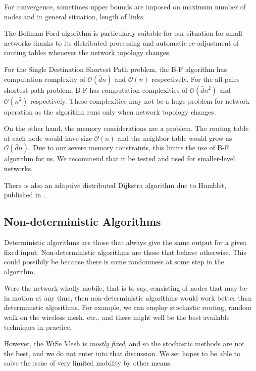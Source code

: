 \documentclass[fleqn,a4paper]{SelfArx}
\begin{document}
For convergence, sometimes upper bounds are imposed on maximum number of nodes and in general situation, length of links.

\par The Bellman-Ford algorithm is particularly suitable for our situation for small networks thanks to its distributed processing and automatic
re-adjustment of routing tables whenever the network topology changes. 

\par For the Single Destination Shortest Path problem, the B-F algorithm has computation complexity of $\mathcal{O}(\bar{d}n)$ and
$\mathcal{O}(n)$ respectively. For the all-pairs shortest path problem, B-F has computation complexities of $\mathcal{O}(\bar{d}n^2)$ 
and $\mathcal{O}(n^2)$ respectively. These complexities may not be a huge problem for network operation as the algorithm runs
only when network topology changes.

\par On the other hand, the memory considerations are a problem. The routing table at each node would have size $\mathcal{O}(n)$ and the 
neighbor table would grow as $\mathcal{O}(\bar{d}n)$. Due to our severe memory constraints, this limits the use of B-F algorithm for us.
We recommend that it be tested and used for smaller-level networks.

\par There is also an adaptive distributed Dijkstra algorithm due to Humblet, published in \cite{Humblet:1988}.

\subsection{Non-deterministic Algorithms}

\par Deterministic algorithms are those that always give the same output for a given fixed input. Non-deterministic algorithms are those
that behave otherwise. This could possibily be because there is some randomness at some step in the algorithm.

\par Were the network wholly mobile, that is to say, consisting of nodes that may be in motion at any time, then non-deterministic algorithms
would work better than deterministic algorithms. For example, we can employ stochastic routing, random walk on the wireless mesh, etc.,
and these might well be the best available techniques in practice.

\par However, the WiSe Mesh is \emph{mostly fixed}, and so the stochastic methods are not the best, and we do not enter into that discussion.
We set hopes to be able to solve the issue of very limited mobility by other means.
\end{document}
